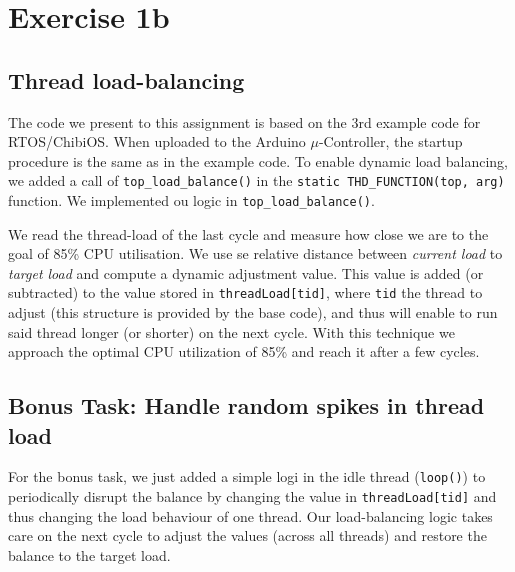 \chapter*{Exercise 1b}

\section*{Thread load-balancing}
The code we present to this assignment is based on the 3rd example code for RTOS/ChibiOS. 
When uploaded to the Arduino $\mu$-Controller, the startup procedure is the same as in the example code. To enable dynamic load balancing, we added a call of \texttt{top\_load\_balance()} in the \texttt{static THD\_FUNCTION(top, arg)} function.
We implemented ou logic in \texttt{top\_load\_balance()}.

We read the thread-load of the last cycle and measure how close we are to the goal of 85\% CPU utilisation. We use se relative distance between \textsl{current load} to \textsl{target load} and compute a dynamic adjustment value. This value is added (or subtracted) to the value stored in \texttt{threadLoad[tid]}, where \texttt{tid} the thread to adjust (this structure is provided by the base code), and thus will enable to run said thread longer (or shorter) on the next cycle.
With this technique we approach the optimal CPU utilization of 85\%  and reach it after a few cycles. 




\section*{Bonus Task: Handle random spikes in thread load}

For the bonus task, we just added a simple logi in the idle thread (\texttt{loop()}) to periodically disrupt the balance by changing the value in \texttt{threadLoad[tid]} and thus changing the load behaviour of one thread. Our load-balancing logic takes care on the next cycle to adjust the values (across all threads) and restore the balance to the target load.
